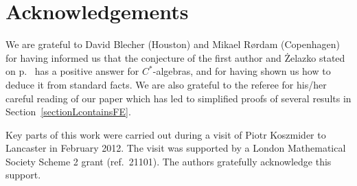 \documentclass[12pt]{amsart}
\theoremstyle{definition}
\numberwithin{equation}{section}
\begin{document}
\section*{Acknowledgements} 
\noindent
We are grateful to David Blecher (Houston) and Mikael R\o{}rdam
(Copenhagen) for having informed us that the conjecture of the first
author and \.{Z}elazko stated on p.~\pageref{DZconj} has a positive
answer for $C^*$-algebras, and for having shown us how to deduce it
from standard facts. We are also grateful to the referee for
his/her careful reading of our paper which has led to simplified
proofs of several results in Section~\ref{sectionLcontainsFE}.

Key parts of this work were carried out during a visit of Piotr
Koszmider to Lancaster in February 2012. The visit was supported by a
London Mathematical Society Scheme 2 grant (ref.~21101). The authors
gratefully acknowledge this support.
\end{document}

